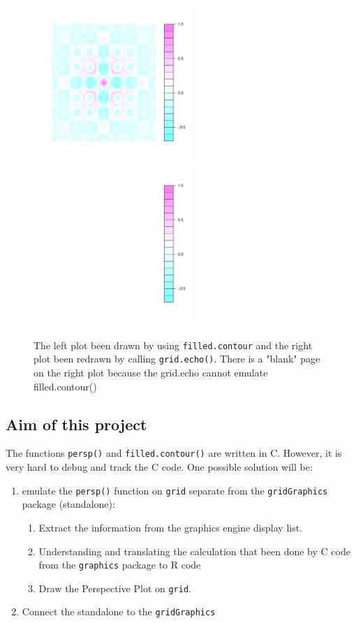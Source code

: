 \documentclass[a4paper,10pt]{article}
\begin{document}
\begin{figure}[h]
\begin{center}
  \includegraphics[height = 6cm, width = 6cm]{figure/report_fill_1}
  \includegraphics[height = 6cm, width = 6cm]{figure/report_fill_2}
  \caption{The left plot been drawn by using \texttt{filled.contour} and the right plot been redrawn by calling \texttt{grid.echo()}. There is a "blank" page on the right plot because the grid.echo cannot emulate filled.contour()}
  	\label{figure4}
\end{center}
\end{figure}

\newpage
\subsection{Aim of this project}
The functions \texttt{persp()} and \texttt{filled.contour()} are written in C. However, it is very hard to debug and track the C code. One possible solution will be:  \\

\begin{enumerate}
  \item emulate the \texttt{persp()} function on \texttt{grid} separate from the \texttt{gridGraphics} package (standalone):
    \begin{enumerate}
      \item Extract the information from the graphics engine display list.
      \item Understanding and translating the calculation that been done by C code from the \texttt{graphics} package to R code
      \item Draw the Perspective Plot on \texttt{grid}.
    \end{enumerate}
  \item Connect the standalone to the \texttt{gridGraphics}
\end{enumerate}
\end{document}
